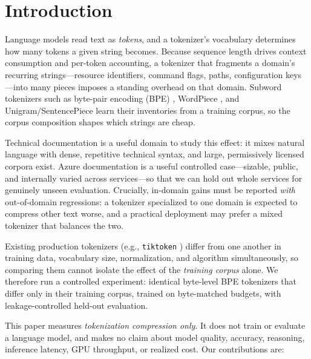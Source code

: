 \section{Introduction}
\label{sec:intro}

Language models read text as \emph{tokens}, and a tokenizer's vocabulary
determines how many tokens a given string becomes. Because sequence length drives
context consumption and per-token accounting, a tokenizer that fragments a domain's
recurring strings---resource identifiers, command flags, paths, configuration
keys---into many pieces imposes a standing overhead on that domain. Subword
tokenizers such as byte-pair encoding (BPE) \citep{sennrich2016bpe}, WordPiece
\citep{schuster2012wordpiece}, and Unigram/SentencePiece
\citep{kudo2018subword,kudo2018sentencepiece} learn their inventories from a
training corpus, so the corpus composition shapes which strings are cheap.

Technical documentation is a useful domain to study this effect: it mixes natural
language with dense, repetitive technical syntax, and large, permissively licensed
corpora exist. Azure documentation is a useful controlled case---sizable,
public, and internally varied across services---so that we can hold out whole
services for genuinely unseen evaluation. Crucially, in-domain gains must be
reported \emph{with} out-of-domain regressions: a tokenizer specialized to one
domain is expected to compress other text worse, and a practical deployment may
prefer a mixed tokenizer that balances the two.

Existing production tokenizers (e.g., \texttt{tiktoken}
\citep{openai2026tiktoken}) differ from one another in training data, vocabulary
size, normalization, and algorithm simultaneously, so comparing them cannot
isolate the effect of the \emph{training corpus} alone. We therefore run a
controlled experiment: identical byte-level BPE tokenizers that differ only in
their training corpus, trained on byte-matched budgets, with leakage-controlled
held-out evaluation.

This paper measures \emph{tokenization compression only}. It does not train or
evaluate a language model, and makes no claim about model quality, accuracy,
reasoning, inference latency, GPU throughput, or realized cost. Our contributions
are:

